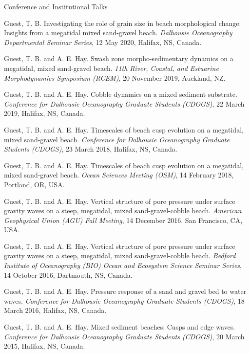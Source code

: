 \documentclass{resume} %
\begin{document}
\begin{rSection}{Conference and Institutional Talks}
	
	Guest, T. B. Investigating the role of grain size in beach morphological change: Insights from a megatidal mixed sand-gravel beach. \textit{Dalhousie Oceanography Departmental Seminar Series}, 12 May 2020, Halifax, NS, Canada.
	
	Guest, T. B. and A. E. Hay. Swash zone morpho-sedimentary dynamics on a megatidal, mixed sand-gravel beach. \textit{11th River, Coastal, and Estuarine Morphodynamics Symposium (RCEM)}, 20 November 2019, Auckland, NZ.
	
	Guest, T. B. and A. E. Hay. Cobble dynamics on a mixed sediment substrate. \textit{Conference for Dalhousie Oceanography Graduate Students (CDOGS)}, 22 March 2019, Halifax, NS, Canada.
	
	Guest, T. B. and A. E. Hay. Timescales of beach cusp evolution on a megatidal, mixed sand-gravel beach. \textit{Conference for Dalhousie Oceanography Graduate Students (CDOGS)}, 23 March 2018, Halifax, NS, Canada.
	
	Guest, T. B. and A. E. Hay. Timescales of beach cusp evolution on a megatidal, mixed sand-gravel beach. \textit{Ocean Sciences Meeting (OSM)}, 14 February 2018, Portland, OR, USA.
	
	Guest, T. B. and A. E. Hay. Vertical structure of pore pressure under surface gravity waves on a steep, megatidal, mixed sand-gravel-cobble beach. \textit{American Geophysical Union (AGU) Fall Meeting}, 14 December 2016, San Francisco, CA, USA.
	
	Guest, T. B. and A. E. Hay. Vertical structure of pore pressure under surface gravity waves on a steep, megatidal, mixed sand-gravel-cobble beach. \textit{Bedford Institute of Oceanography (BIO) Ocean and Ecosystem Science Seminar Series}, 14 October 2016, Dartmouth, NS, Canada.
	
	Guest, T. B. and A. E. Hay. Pressure response of a sand and gravel bed to water waves. \textit{Conference for Dalhousie Oceanography Graduate Students (CDOGS)}, 18 March 2016, Halifax, NS, Canada.
	
	Guest, T. B. and A. E. Hay. Mixed sediment beaches: Cusps and edge waves. \textit{Conference for Dalhousie Oceanography Graduate Students (CDOGS)}, 20 March 2015, Halifax, NS, Canada.
	
\end{rSection}
\end{document}
